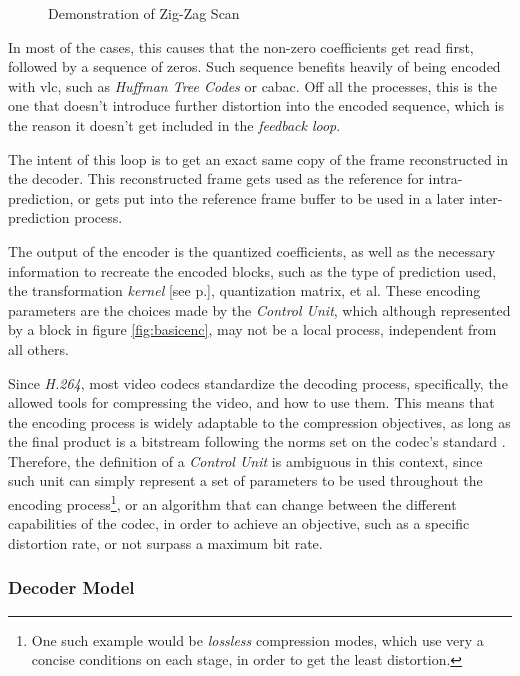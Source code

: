 \begin{figure}[!htbp]
    \centering
    
    \caption{Demonstration of Zig-Zag Scan}
    \label{fig:zigzag}
\end{figure}

In most of the cases, this causes that the non-zero coefficients get read first, followed by a sequence of zeros. Such sequence benefits heavily of being encoded with \gls{vlc}, such as \emph{Huffman Tree Codes} or \Gls{cabac}. Off all the processes, this is the one that doesn't introduce further distortion into the encoded sequence, which is the reason it doesn't get included in the \emph{feedback loop}.

The intent of this loop is to get an exact same copy of the frame reconstructed in the decoder. This reconstructed frame gets used as the reference for intra-prediction, or gets put into the reference frame buffer to be used in a later inter-prediction process. 

The output of the encoder is the quantized coefficients, as well as the necessary information to recreate the encoded blocks, such as the type of prediction used, the transformation \emph{kernel} [see p.\pageref{par:kernel}], quantization matrix, et al. These encoding parameters are the choices made by the \emph{Control Unit}, which although represented by a block in figure \ref{fig:basicenc}, may not be a local process, independent from all others. 

Since \emph{H.264}, most video codecs standardize the decoding process, specifically, the allowed tools for compressing the video, and how to use them. This means that the encoding process is widely adaptable to the compression objectives, as long as the final product is a bitstream following the norms set on the codec's standard \cite{AV1BitstreamDecoding}. Therefore, the definition of a \emph{Control Unit} is ambiguous in this context, since such unit can simply represent a set of parameters to be used throughout the encoding process\footnote{One such example would be \emph{lossless} compression modes, which use very a concise conditions on each stage, in order to get the least distortion.}, or an algorithm that can change between the different capabilities of the codec, in order to achieve an objective, such as a specific distortion rate, or not surpass a maximum bit rate.

\subsubsection{Decoder Model}

